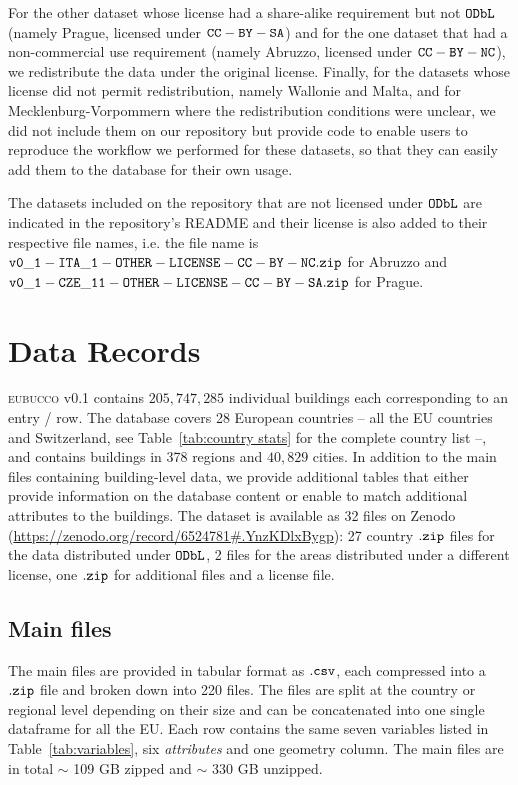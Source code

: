 \documentclass[fleqn,10pt]{wlscirep}
\begin{document}
For the other dataset whose license had a share-alike requirement but not ${\tt ODbL}$ (namely Prague, licensed under ${\tt CC-BY-SA}$) and for the one dataset that had a non-commercial use requirement (namely Abruzzo, licensed under ${\tt CC-BY-NC}$), we redistribute the data under the original license. Finally, for the datasets whose license did not permit redistribution, namely Wallonie and Malta, and for Mecklenburg-Vorpommern where the redistribution conditions were unclear, we did not include them on our repository but provide code to enable users to reproduce the workflow we performed for these datasets, so that they can easily add them to the database for their own usage. 

The datasets included on the repository that are not licensed under ${\tt ODbL}$ are indicated in the repository's README and their license is also added to their respective file names, i.e. the file name is ${\tt v0\_1-ITA\_1-OTHER-LICENSE-CC-BY-NC.zip}$ for Abruzzo and ${\tt v0\_1-CZE\_11-OTHER-LICENSE-CC-BY-SA.zip}$ for Prague.


\section*{Data Records}

\textsc{eubucco} v0.1 \cite{eubucco_v0.1_2022_dataset} contains $205, 747, 285$ individual buildings each corresponding to an entry / row. The database covers 28 European countries -- all the EU countries and Switzerland, see Table~\ref{tab:country stats} for the complete country list --, and contains buildings in 378 regions and $40,829$ cities. In addition to the main files containing building-level data, we provide additional tables that either provide information on the database content or enable to match additional attributes to the buildings. The dataset is available as 32 files on Zenodo  (\url{https://zenodo.org/record/6524781#.YnzKDlxBygp}): 27 country ${\tt .zip}$ files for the data distributed under ${\tt ODbL}$, 2 files for the areas distributed under a different license, one ${\tt .zip}$ for additional files and a license file.

\subsection*{Main files}
The main files are provided in tabular format as $\tt{.csv}$, each compressed into a $\tt{.zip}$ file and broken down into 220 files. The files are split at the country or regional level depending on their size and can be concatenated into one single dataframe for all the EU.  Each row contains the same seven variables listed in Table~\ref{tab:variables}, six \textit{attributes} and one geometry column. The main files are in total $\sim$ 109 GB zipped and $\sim$ 330 GB unzipped.
\end{document}
